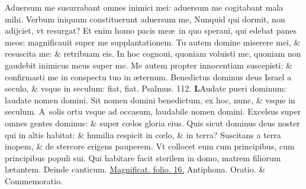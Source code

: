 \documentclass[a5paper,10pt]{book}
\def\ae{æ}
\def\oe{œ}
\begin{document}
\begin{multicols*}{2}
\newline \color{red} A\color{black}duersum me susurrabant omnes inimici mei: aduersum me cogitabant mala mihi.
\newline \color{red} V\color{black}erbum iniquum constituerunt aduersum me, Nunquid qui dormit, non adijciet, vt resurgat?
\newline \color{red} E\color{black}t enim homo pacis me\ae \ in quo speraui, qui edebat panes meos: magnificauit super me supplantationem.%
\newline \color{red} T\color{black}u autem domine miserere mei, \& resuscita me: \& retribuam eis.
\newline \color{red} I\color{black}n hoc cognoui, quoniam voluisti me, quoniam non gaudebit inimicus meus super me.
\newline \color{red} M\color{black}e autem propter innocentiam suscepisti: \& confirmasti me in conspectu tuo in \ae ternum.
\newline \color{red} B\color{black}enedictus dominus deus Israel a seculo, \& vsque in seculum: fiat, fiat.
\newline \color{red} Psalmus. \hypertarget{ps112}{112.} \color{black}
\vspace{-1em}
\lettrine[lines=2]{\bfseries \color{red} L}{}Audate pueri dominum: laudate nomen domini.
\newline \color{red} S\color{black}it nomen domini benedictum, ex hoc, nunc, \& vsque in seculum.
\newline \color{red} A\color{black}\ solis ortu vsque ad occasum, laudabile nomen domini.
\newline \color{red} E\color{black}xcelsus super omnes gentes dominus: \& super c\oe los gloria eius.
\newline \color{red} Q\color{black}uis sicut dominus deus noster qui in altis habitat: \& humilia respicit in c\oe lo, \& in terra?
\newline \color{red} S\color{black}uscitans a terra inopem, \& de stercore erigens pauperem.
\newline \color{red} V\color{black}t collocet eum cum principibus, cum principibus populi sui.
\newline \color{red} Q\color{black}ui habitare facit sterilem in domo, matrem filiorum l\ae tantem.
\newline \color{red} Deinde canticum. \color{black} \hyperlink{Magnificat}{Magnificat. folio. 16.} \color{red} Antiphona. Oratio. \& Commemoratio. \color{black}
\vspace{-1em}

\end{multicols*}
\end{document}
